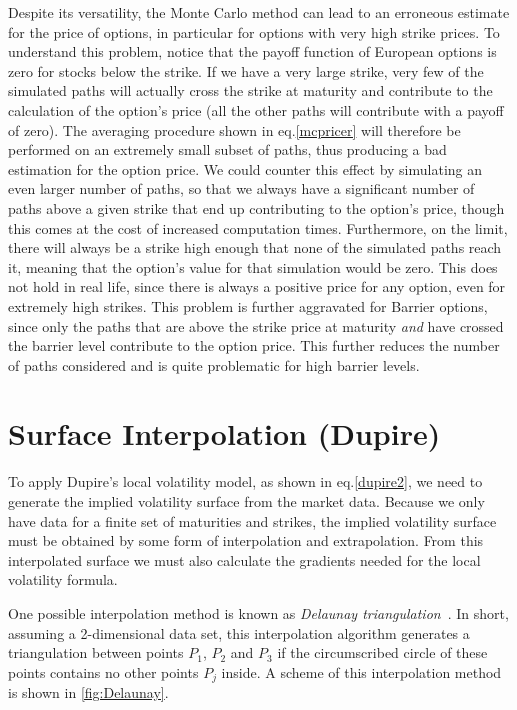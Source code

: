 Despite its versatility, the Monte Carlo method can lead to an erroneous estimate for the price of options, in particular for options with very high strike prices. To understand this problem, notice that the payoff function of European options is zero for stocks below the strike. If we have a very large strike, very few of the simulated paths will actually cross the strike at maturity and contribute to the calculation of the option's price (all the other paths will contribute with a payoff of zero). The averaging procedure shown in eq.\eqref{mcpricer} will therefore be performed on an extremely small subset of paths, thus producing a bad estimation for the option price.
We could counter this effect by simulating an even larger number of paths, so that we always have a significant number of paths above a given strike that end up contributing to the option's price, though this comes at the cost of increased computation times.
Furthermore, on the limit, there will always be a strike high enough that none of the simulated paths reach it, meaning that the option's value for that simulation would be zero. This does not hold in real life, since there is always a positive price for any option, even for extremely high strikes.
This problem is further aggravated for Barrier options, since only the paths that are above the strike price at maturity \emph{and} have crossed the barrier level contribute to the option price. This further reduces the number of paths considered and is quite problematic for high barrier levels.

\section{Surface Interpolation (Dupire)}
\label{section:Surface Interpolation (Dupire)}
To apply Dupire's local volatility model, as shown in eq.\eqref{dupire2}, we need to generate the implied volatility surface from the market data. Because we only have data for a finite set of maturities and strikes, the implied volatility surface must be obtained by some form of interpolation and extrapolation. From this interpolated surface we must also calculate the gradients needed for the local volatility formula.

 
One possible interpolation method is known as \emph{Delaunay triangulation}~\citep{Isaac}. In short, assuming a 2-dimensional data set, this interpolation algorithm generates a triangulation between points $P_1$, $P_2$ and $P_3$ if the circumscribed circle of these points contains no other points $P_j$ inside. A scheme of this interpolation method is shown in \autoref{fig:Delaunay}.

